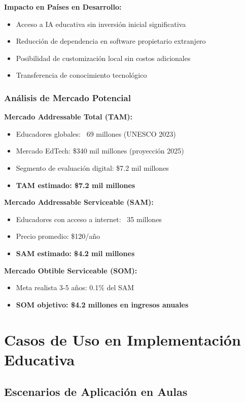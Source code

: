 \documentclass[12pt,a4paper]{report}
\begin{document}
\textbf{Impacto en Países en Desarrollo:}
\begin{itemize}
\item Acceso a IA educativa sin inversión inicial significativa
\item Reducción de dependencia en software propietario extranjero
\item Posibilidad de customización local sin costos adicionales
\item Transferencia de conocimiento tecnológico
\end{itemize}

\subsubsection{Análisis de Mercado Potencial}

\textbf{Mercado Addressable Total (TAM):}
\begin{itemize}
\item Educadores globales: ~69 millones (UNESCO 2023)
\item Mercado EdTech: \$340 mil millones (proyección 2025)
\item Segmento de evaluación digital: \$7.2 mil millones
\item \textbf{TAM estimado: \$7.2 mil millones}
\end{itemize}

\textbf{Mercado Addressable Serviceable (SAM):}
\begin{itemize}
\item Educadores con acceso a internet: ~35 millones
\item Precio promedio: \$120/año
\item \textbf{SAM estimado: \$4.2 mil millones}
\end{itemize}

\textbf{Mercado Obtible Serviceable (SOM):}
\begin{itemize}
\item Meta realista 3-5 años: 0.1\% del SAM
\item \textbf{SOM objetivo: \$4.2 millones en ingresos anuales}
\end{itemize}

\section{Casos de Uso en Implementación Educativa}

\subsection{Escenarios de Aplicación en Aulas}
\end{document}
